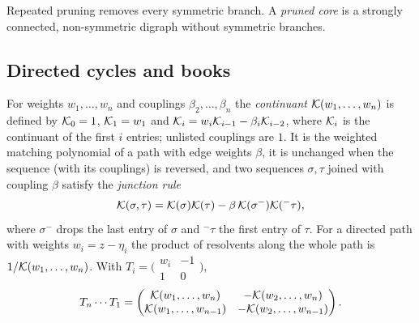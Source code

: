 Repeated pruning removes every symmetric branch. A \emph{pruned core} is a strongly connected, non-symmetric digraph without symmetric branches.

\subsection{Directed cycles and books}\label{ssec:setpot-cycles}
For weights $w_1,\dots,w_n$ and couplings $\beta_2,\dots,\beta_n$ the \emph{continuant} $\mathcal{K}(w_1,\dots,w_n)$ is defined by $\mathcal{K}_0=1$, $\mathcal{K}_1=w_1$ and $\mathcal{K}_i=w_i\mathcal{K}_{i-1}-\beta_i\mathcal{K}_{i-2}$, where $\mathcal{K}_i$ is the continuant of the first $i$ entries; unlisted couplings are $1$. It is the weighted matching polynomial of a path with edge weights $\beta$, it is unchanged when the sequence (with its couplings) is reversed, and two sequences $\sigma,\tau$ joined with coupling $\beta$ satisfy the \emph{junction rule}
\[
\mathcal{K}(\sigma,\tau)=\mathcal{K}(\sigma)\mathcal{K}(\tau)-\beta\,\mathcal{K}(\sigma^{-})\mathcal{K}({}^{-}\tau),
\]
where $\sigma^{-}$ drops the last entry of $\sigma$ and ${}^{-}\tau$ the first entry of $\tau$. For a directed path with weights $w_i=z-\eta_i$ the product of resolvents along the whole path is $1/\mathcal{K}(w_1,\dots,w_n)$. With $T_i=\bigl(\begin{smallmatrix}w_i&-1\\1&0\end{smallmatrix}\bigr)$,
\[
T_n\cdots T_1=\begin{pmatrix}\mathcal{K}(w_1,\dots,w_n)&-\mathcal{K}(w_2,\dots,w_n)\\ \mathcal{K}(w_1,\dots,w_{n-1})&-\mathcal{K}(w_2,\dots,w_{n-1})\end{pmatrix}.
\]

